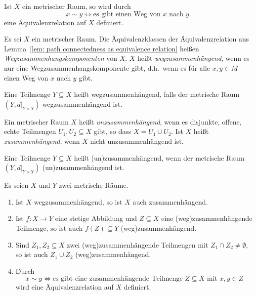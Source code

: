 \begin{lemma}\label{lem: path connectedness as equivalence relation}
  Ist $X$ ein metrischer Raum, so wird durch
  \[
    x \sim y
    \iff
    \text{es gibt einen Weg von $x$ nach $y$}.
  \]
  eine Äquivalenzrelation auf $X$ definiert.
\end{lemma}


\begin{definition}
  Es sei $X$ ein metrischer Raum.
  Die Äquivalenzklassen der Äquivalenzrelation aus Lemma~\ref{lem: path connectedness as equivalence relation} heißen \emph{Wegzusammenhangskomponenten} von $X$.
  $X$ heißt \emph{wegzusammenhängend}, wenn es nur eine Wegzusammenhangskomponente gibt, d.h.\ wenn es für alle $x, y \in M$ einen Weg von $x$ nach $y$ gibt.
  
  Eine Teilmenge $Y \subseteq X$ heißt wegzusammenhängend, falls der metrische Raum $(Y, d|_{Y \times Y})$ wegzusammenhängend ist.
\end{definition}


\begin{definition}
  Ein metrischer Raum $X$ heißt \emph{unzusammenhängend}, wenn es disjunkte, offene, echte Teilmengen $U_1, U_2 \subseteq X$ gibt, so dass $X = U_1 \cup U_2$.
  Ist $X$ heißt \emph{zusammenhängend}, wenn $X$ nicht unzusammenhängend ist.
  
  Eine Teilmenge $Y \subseteq X$ heißt (un)zusammenhängend, wenn der metrische Raum $(Y, d|_{Y \times Y})$ (un)zusammenhängend ist.
\end{definition}


\begin{proposition}\label{prop: equivalence relation for connectedness}
  Es seien $X$ und $Y$ zwei metrische Räume.
  \begin{enumerate}[leftmargin=*, label=\roman*)]
    \item
      Ist $X$ wegzusammenhängend, so ist $X$ auch zusammenhängend.
    \item
      Ist $f \colon X \to Y$ eine stetige Abbildung und $Z \subseteq X$ eine (weg)zusammenhängende Teilmenge, so ist auch $f(Z) \subseteq Y$ (weg)zusammenhängend.
    \item
      Sind $Z_1, Z_2 \subseteq X$ zwei (weg)zusammenhängende Teilmengen mit $Z_1 \cap Z_2 \neq \emptyset$, so ist auch $Z_1 \cup Z_2$ (weg)zusammenhängend.
    \item
      Durch
      \[
        x \sim y
        \iff
        \text{es gibt eine zusammenhängende Teilmenge $Z \subseteq X$ mit $x, y \in Z$}
      \]
      wird eine Äquivalenzrelation auf $X$ definiert.
  \end{enumerate}
\end{proposition}


